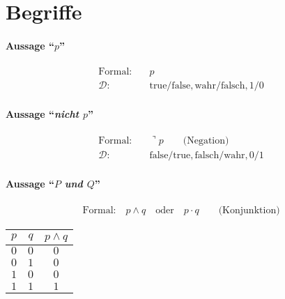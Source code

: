 %
%

\newcommand{\ztf}{{\huge\mathfrak{z}}}

\section{Begriffe}

\paragraph{Aussage ``$p$''}
\begin{align*}
	\text{Formal:}&\quad p \\
	\mathcal{D}\text{:} & \quad\text{true/false}, \text{wahr/falsch}, 1/0
\end{align*}

\paragraph{Aussage ``\textit{nicht $p$}''}
\begin{align*}
	\text{Formal:}&\quad\urcorner p\qquad\text{(Negation)} \\
	\mathcal{D}\text{:} & \quad\text{false/true}, \text{falsch/wahr}, 0/1
\end{align*}

\paragraph{Aussage ``\textit{$P$ und $Q$}''}
\begin{gather*}
	\text{Formal:} \quad p\wedge q\quad\text{oder}\quad p\cdot q\qquad\text{(Konjunktion)}
\end{gather*}
\begin{center}
	\begin{tabular}{cc|c}
		\hline
		$p$ & $q$ & $p\wedge q$ \\
		\hline
		$0$ & $0$ & $0$ \\
		$0$ & $1$ & $0$ \\
		$1$ & $0$ & $0$ \\
		$1$ & $1$ & $1$ \\
	\end{tabular}
\end{center}

